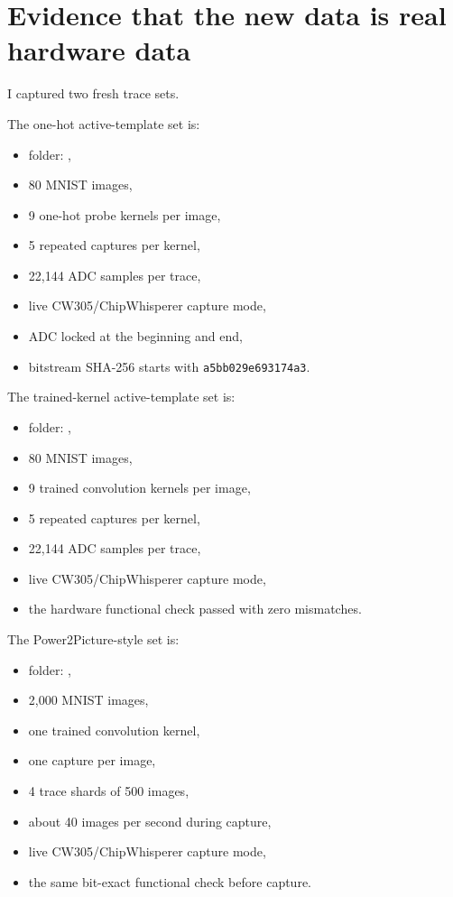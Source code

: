 \documentclass[11pt]{article}
\begin{document}
\section*{Evidence that the new data is real hardware data}

I captured two fresh trace sets.

The one-hot active-template set is:

\begin{itemize}
  \item folder: ,
  \item 80 MNIST images,
  \item 9 one-hot probe kernels per image,
  \item 5 repeated captures per kernel,
  \item 22,144 ADC samples per trace,
  \item live CW305/ChipWhisperer capture mode,
  \item ADC locked at the beginning and end,
  \item bitstream SHA-256 starts with
  \texttt{a5bb029e693174a3}.
\end{itemize}

The trained-kernel active-template set is:

\begin{itemize}
  \item folder: ,
  \item 80 MNIST images,
  \item 9 trained convolution kernels per image,
  \item 5 repeated captures per kernel,
  \item 22,144 ADC samples per trace,
  \item live CW305/ChipWhisperer capture mode,
  \item the hardware functional check passed with zero mismatches.
\end{itemize}

The Power2Picture-style set is:

\begin{itemize}
  \item folder: ,
  \item 2,000 MNIST images,
  \item one trained convolution kernel,
  \item one capture per image,
  \item 4 trace shards of 500 images,
  \item about 40 images per second during capture,
  \item live CW305/ChipWhisperer capture mode,
  \item the same bit-exact functional check before capture.
\end{itemize}
\end{document}

